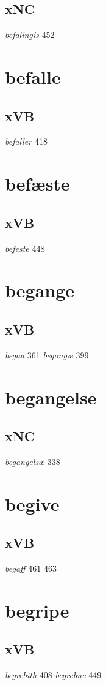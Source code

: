 \documentclass[a4paper,twocolumn]{article}
\begin{document}
\subsection{xNC}
\label{sec:orga9e9d49}
\emph{befalingis} 452 
\section{befalle}
\label{sec:org0f25f2e}
\subsection{xVB}
\label{sec:orge79f7f8}
\emph{befaller} 418 
\section{befæste}
\label{sec:org36dffeb}
\subsection{xVB}
\label{sec:orgc6f1af9}
\emph{befeste} 448 
\section{begange}
\label{sec:org4da2bff}
\subsection{xVB}
\label{sec:orgc1b8391}
\emph{begaa} 361 \emph{begongæ} 399 
\section{begangelse}
\label{sec:org9802265}
\subsection{xNC}
\label{sec:orge039940}
\emph{begangelsæ} 338 
\section{begive}
\label{sec:orgd6cf1df}
\subsection{xVB}
\label{sec:org3d88c6d}
\emph{begaff} 461 463 
\section{begripe}
\label{sec:org2ea73d7}
\subsection{xVB}
\label{sec:org276657b}
\emph{begrebith} 408 \emph{begrebne} 449 
\end{document}

